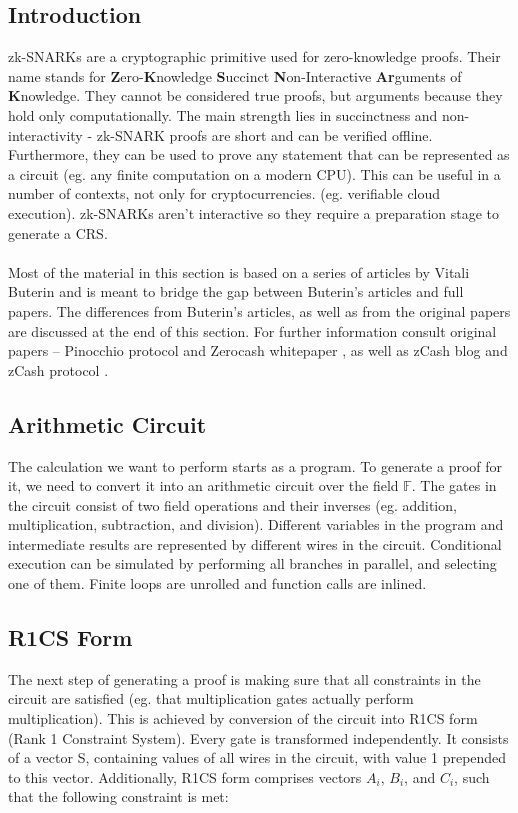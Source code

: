 \subsection{Introduction}
zk-SNARKs are a cryptographic primitive used for zero-knowledge proofs. Their name stands for \textbf{Z}ero-\textbf{K}nowledge \textbf{S}uccinct \textbf{N}on-Interactive \textbf{Ar}guments of \textbf{K}nowledge. They cannot be considered true proofs, but arguments because they hold only computationally. The main strength lies in succinctness and non-interactivity - zk-SNARK proofs are short and can be verified offline. Furthermore, they can be used to prove any statement that can be represented as a circuit (eg. any finite computation on a modern CPU). This can be useful in a number of contexts, not only for cryptocurrencies. (eg. verifiable cloud execution). zk-SNARKs aren't interactive so they require a preparation stage to generate a CRS.\\
\\
Most of the material in this section is based on a series of articles by Vitali Buterin \cite{buterin1, buterin2, buterin3} and is meant to bridge the gap between Buterin's articles and full papers. The differences from Buterin's articles, as well as from the original papers are discussed at the end of this section. For further information consult original papers -- Pinocchio protocol\cite{parno2013pinocchio} and Zerocash whitepaper \cite{sasson2014zerocash}, as well as zCash blog \cite{zcashzksnarks} and zCash protocol \cite{zcashprotocol}. %

\subsection{Arithmetic Circuit}

The calculation we want to perform starts as a program. To generate a proof for it, we need to convert it into an arithmetic circuit over the field $\mathbb{F}$. The gates in the circuit consist of two field operations and their inverses (eg. addition, multiplication, subtraction, and division). Different variables in the program and intermediate results are represented by different wires in the circuit. Conditional execution can be simulated by performing all branches in parallel, and selecting one of them. Finite loops are unrolled and function calls are inlined.

\subsection{R1CS Form}
The next step of generating a proof is making sure that all constraints in the circuit are satisfied (eg. that multiplication gates actually perform multiplication). This is achieved by conversion of the circuit into R1CS form (Rank 1 Constraint System). Every gate is transformed independently. It consists of a vector S, containing values of all wires in the circuit, with value 1 prepended to this vector. Additionally, R1CS form comprises vectors $A_i$, $B_i$, and $C_i$, such that the following constraint is met:

